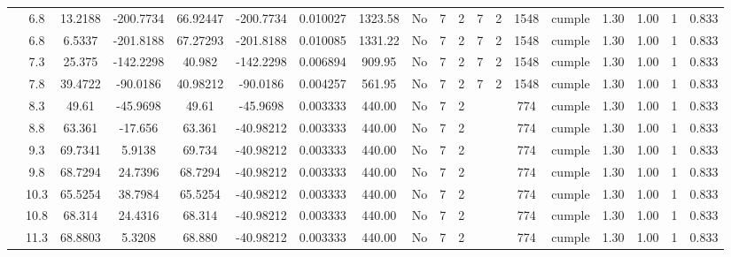 \begin{table}[H]
{\begin{tabular}{|c|c|c|c|c|c|r|c|c|c|c|c|c|c|c|c|c|c|c|}
\cline{2-19}        & \cellcolor[rgb]{ .851,  .882,  .949}6.8 & 13.2188 & -200.7734 & 66.92447 & -200.7734 & 0.010027 & 1323.58 & No  & 7   & 2   & 7   & 2   & 1548 & \cellcolor[rgb]{ .776,  .937,  .808}cumple & 1.30 & 1.00 & 1   & 0.833 \bigstrut\\
\cline{2-19}        & \cellcolor[rgb]{ .851,  .882,  .949}6.8 & 6.5337 & -201.8188 & 67.27293 & -201.8188 & 0.010085 & 1331.22 & No  & 7   & 2   & 7   & 2   & 1548 & \cellcolor[rgb]{ .776,  .937,  .808}cumple & 1.30 & 1.00 & 1   & 0.833 \bigstrut\\
\cline{2-19}        & 7.3 & 25.375 & -142.2298 & 40.982 & -142.2298 & 0.006894 & 909.95 & No  & 7   & 2   & 7   & 2   & 1548 & \cellcolor[rgb]{ .776,  .937,  .808}cumple & 1.30 & 1.00 & 1   & 0.833 \bigstrut\\
\cline{2-19}        & 7.8 & 39.4722 & -90.0186 & 40.98212 & -90.0186 & 0.004257 & 561.95 & No  & 7   & 2   & 7   & 2   & 1548 & \cellcolor[rgb]{ .776,  .937,  .808}cumple & 1.30 & 1.00 & 1   & 0.833 \bigstrut\\
\cline{2-19}        & 8.3 & 49.61 & -45.9698 & 49.61 & -45.9698 & 0.003333 & 440.00 & No  & 7   & 2   &     &     & 774 & \cellcolor[rgb]{ .776,  .937,  .808}cumple & 1.30 & 1.00 & 1   & 0.833 \bigstrut\\
\cline{2-19}        & 8.8 & 63.361 & -17.656 & 63.361 & -40.98212 & 0.003333 & 440.00 & No  & 7   & 2   &     &     & 774 & \cellcolor[rgb]{ .776,  .937,  .808}cumple & 1.30 & 1.00 & 1   & 0.833 \bigstrut\\
\cline{2-19}        & 9.3 & 69.7341 & 5.9138 & 69.734 & -40.98212 & 0.003333 & 440.00 & No  & 7   & 2   &     &     & 774 & \cellcolor[rgb]{ .776,  .937,  .808}cumple & 1.30 & 1.00 & 1   & 0.833 \bigstrut\\
\cline{2-19}        & 9.8 & 68.7294 & 24.7396 & 68.7294 & -40.98212 & 0.003333 & 440.00 & No  & 7   & 2   &     &     & 774 & \cellcolor[rgb]{ .776,  .937,  .808}cumple & 1.30 & 1.00 & 1   & 0.833 \bigstrut\\
\cline{2-19}        & 10.3 & 65.5254 & 38.7984 & 65.5254 & -40.98212 & 0.003333 & 440.00 & No  & 7   & 2   &     &     & 774 & \cellcolor[rgb]{ .776,  .937,  .808}cumple & 1.30 & 1.00 & 1   & 0.833 \bigstrut\\
\cline{2-19}        & 10.8 & 68.314 & 24.4316 & 68.314 & -40.98212 & 0.003333 & 440.00 & No  & 7   & 2   &     &     & 774 & \cellcolor[rgb]{ .776,  .937,  .808}cumple & 1.30 & 1.00 & 1   & 0.833 \bigstrut\\
\cline{2-19}        & 11.3 & 68.8803 & 5.3208 & 68.880 & -40.98212 & 0.003333 & 440.00 & No  & 7   & 2   &     &     & 774 & \cellcolor[rgb]{ .776,  .937,  .808}cumple & 1.30 & 1.00 & 1   & 0.833 \bigstrut\\

\end{tabular}}
\end{table}
